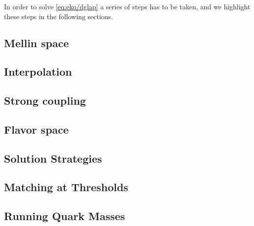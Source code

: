 In order to solve \cref{eq:eko/dglap} a series of steps has to be taken, and we
highlight these steps in the following sections.

\subsection{Mellin space}
\label{sec:eko/theory-mellin}


\subsection{Interpolation}
\label{sec:eko/theory-interpolation}


\subsection{Strong coupling}
\label{sec:eko/theory-coupling}


\subsection{Flavor space}
\label{sec:eko/theory-flavor}


\subsection{Solution Strategies}
\label{sec:eko/theory-solutions}


\subsection{Matching at Thresholds}
\label{sec:eko/theory-matching}


\subsection{Running Quark Masses}
\label{sec:eko/theory-msbarmass}

